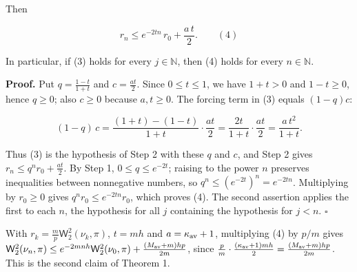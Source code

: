 \documentclass[11pt,a4paper]{article}
\begin{document}
Then


\[r_n\le e^{-2tn}\,r_0+\frac{a\,t}2.\qquad(4)\]


In particular, if (3) holds for every \(j\in\mathbb N\), then (4) holds for every \(n\in\mathbb N\).




\textbf{Proof.} Put \(q=\frac{1-t}{1+t}\) and \(c=\frac{at}2\). Since \(0\le t\le1\), we have \(1+t>0\) and \(1-t\ge0\), hence \(q\ge0\); also \(c\ge0\) because \(a,t\ge0\). The forcing term in (3) equals \((1-q)c\):


\[(1-q)\,c=\frac{(1+t)-(1-t)}{1+t}\cdot\frac{at}2=\frac{2t}{1+t}\cdot\frac{at}2=\frac{a\,t^2}{1+t}.\]


Thus (3) is the hypothesis of Step 2 with these \(q\) and \(c\), and Step 2 gives \(r_n\le q^nr_0+\frac{at}2\). By Step 1, \(0\le q\le e^{-2t}\); raising to the power \(n\) preserves inequalities between nonnegative numbers, so \(q^n\le(e^{-2t})^n=e^{-2tn}\). Multiplying by \(r_0\ge0\) gives \(q^nr_0\le e^{-2tn}r_0\), which proves (4). The second assertion applies the first to each \(n\), the hypothesis for all \(j\) containing the hypothesis for \(j<n\). \(\square\)




With \(r_k=\frac mp\mathsf W_2^2(\nu_k,\pi)\), \(t=mh\) and \(a=\kappa_{\rm av}+1\), multiplying (4) by \(p/m\) gives \(\mathsf W_2^2(\nu_n,\pi)\le e^{-2mnh}\mathsf W_2^2(\nu_0,\pi)+\frac{(M_{\rm av}+m)hp}{2m}\), since \(\frac pm\cdot\frac{(\kappa_{\rm av}+1)mh}2=\frac{(M_{\rm av}+m)hp}{2m}\). This is the second claim of Theorem 1.
\end{document}
